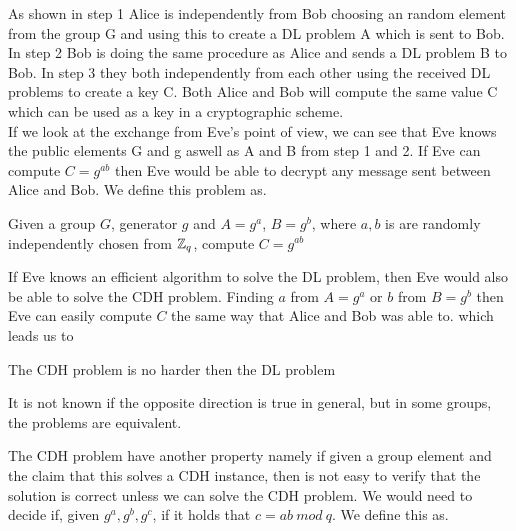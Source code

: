 \noindent
As shown in step 1 Alice is independently from Bob choosing an random element from the group G and using this to create a DL problem A which is sent to Bob. In step 2 Bob is doing the same procedure as Alice and sends a DL problem B to Bob. In step 3 they both independently from each other using the received DL problems to create a key C. Both Alice and Bob will compute the same value C which can be used as a key in a cryptographic scheme. \\

\noindent
If we look at the exchange from Eve's point of view, we can see that Eve knows the public elements G and g aswell as A and B from step 1 and 2. If Eve can compute $C = g^{ab}$ then Eve would be able to decrypt any message sent between Alice and Bob. We define this problem as. \\

\begin{defi}
Given a group $G$, generator $g$ and $A = g^a$, $B = g^b$, where $a,b$ is are randomly independently chosen from $\mathbb{Z}_q$, compute $C=g^{ab}$ 
\end{defi}

\noindent
If Eve knows an efficient algorithm to solve the DL problem, then Eve would also be able to solve the CDH problem. Finding $a$ from $A = g^a$ or $b$ from $B = g^b$ then Eve can easily compute $C$ the same way that Alice and Bob was able to. which leads us to  

\begin{lemma}
The CDH problem is no harder then the DL problem
\end{lemma}

\noindent
It is not known if the opposite direction is true in general, but in some groups, the problems are equivalent.      

 The CDH problem have another property namely if given a group element and the claim that this solves a CDH instance, then is not easy to verify that the solution is correct unless we can solve the CDH problem. 
\noindent
We would need to decide if, given $g^a, g^b, g^c$, if it holds that $c = ab \ mod \ q$. We define this as. \\

\iffalse
    \begin{defi}[Decisional Diffie-Hellman (DDH) problem]
    \begin{math}g\in\Z_p, \ g\neq1 \end{math}\\ 
    Given \begin{math}(g,g^a,g^b,g^c)\end{math} decide if  \begin{math}(a*b=c)\end{math} is hard problem.\\
    Definition: Need a reference??
    \end{defi}
\fi 

